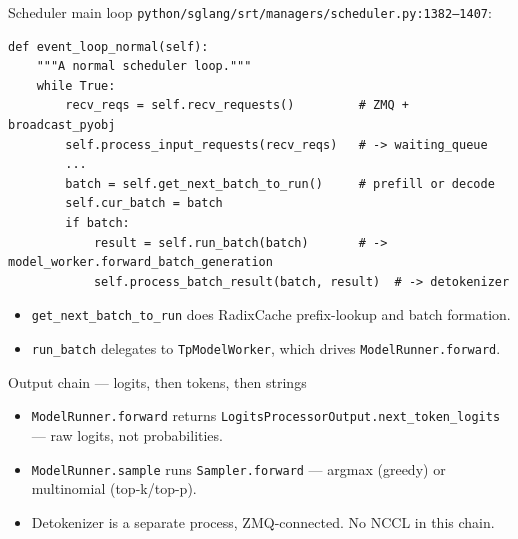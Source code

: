 \documentclass[aspectratio=169,10pt]{beamer}
\begin{document}
\begin{frame}[fragile]{Scheduler main loop}
  \footnotesize
  \texttt{python/sglang/srt/managers/scheduler.py:1382--1407}:
\begin{lstlisting}
def event_loop_normal(self):
    """A normal scheduler loop."""
    while True:
        recv_reqs = self.recv_requests()         # ZMQ + broadcast_pyobj
        self.process_input_requests(recv_reqs)   # -> waiting_queue
        ...
        batch = self.get_next_batch_to_run()     # prefill or decode
        self.cur_batch = batch
        if batch:
            result = self.run_batch(batch)       # -> model_worker.forward_batch_generation
            self.process_batch_result(batch, result)  # -> detokenizer
\end{lstlisting}
  \begin{itemize}\scriptsize
    \item \texttt{get\_next\_batch\_to\_run} does RadixCache prefix-lookup and batch formation.
    \item \texttt{run\_batch} delegates to \texttt{TpModelWorker}, which drives \texttt{ModelRunner.forward}.
  \end{itemize}
\end{frame}

\begin{frame}{Output chain --- logits, then tokens, then strings}
  \centering
  \vspace{0.4cm}
  \begin{itemize}\footnotesize
    \item \texttt{ModelRunner.forward} returns \texttt{LogitsProcessorOutput.next\_token\_logits} --- raw logits, not probabilities.
    \item \texttt{ModelRunner.sample} runs \texttt{Sampler.forward} --- argmax (greedy) or multinomial (top-k/top-p).
    \item Detokenizer is a separate process, ZMQ-connected. No NCCL in this chain.
  \end{itemize}
\end{frame}
\end{document}
